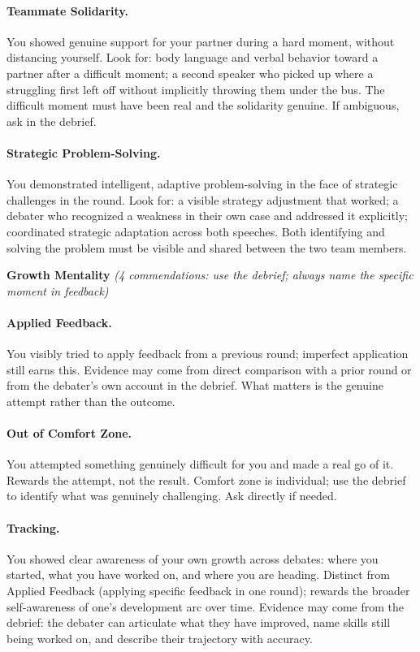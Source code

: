 \documentclass[12pt]{article}
\begin{document}
\paragraph{Teammate Solidarity.} You showed genuine support for your partner during a hard moment, without distancing yourself. Look for: body language and verbal behavior toward a partner after a difficult moment; a second speaker who picked up where a struggling first left off without implicitly throwing them under the bus. The difficult moment must have been real and the solidarity genuine. If ambiguous, ask in the debrief.

\paragraph{Strategic Problem-Solving.} You demonstrated intelligent, adaptive problem-solving in the face of strategic challenges in the round. Look for: a visible strategy adjustment that worked; a debater who recognized a weakness in their own case and addressed it explicitly; coordinated strategic adaptation across both speeches. Both identifying and solving the problem must be visible and shared between the two team members.

\medskip
\noindent\textbf{Growth Mentality} \textit{(4 commendations: use the debrief; always name the specific moment in feedback)}

\paragraph{Applied Feedback.} You visibly tried to apply feedback from a previous round; imperfect application still earns this. Evidence may come from direct comparison with a prior round or from the debater's own account in the debrief. What matters is the genuine attempt rather than the outcome.

\paragraph{Out of Comfort Zone.} You attempted something genuinely difficult for you and made a real go of it. Rewards the attempt, not the result. Comfort zone is individual; use the debrief to identify what was genuinely challenging. Ask directly if needed.

\paragraph{Tracking.} You showed clear awareness of your own growth across debates: where you started, what you have worked on, and where you are heading. Distinct from Applied Feedback (applying specific feedback in one round); rewards the broader self-awareness of one's development arc over time. Evidence may come from the debrief: the debater can articulate what they have improved, name skills still being worked on, and describe their trajectory with accuracy.
\end{document}
